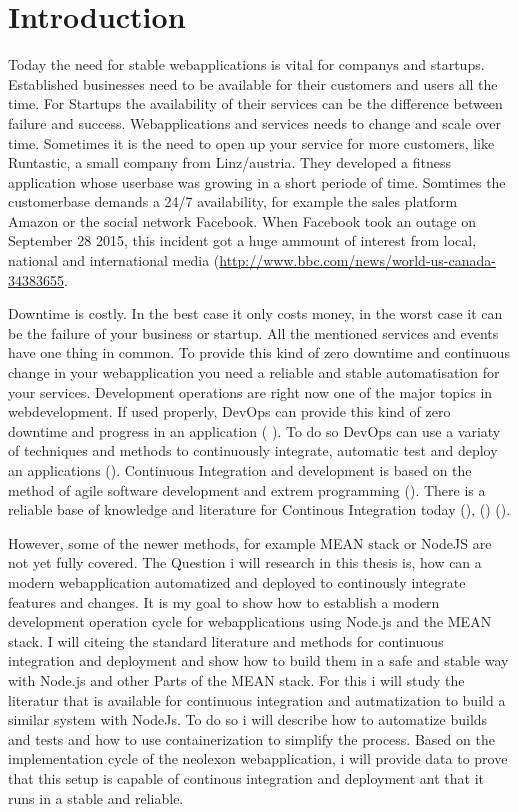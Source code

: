 \section{Introduction}
Today the need for stable webapplications is vital for companys and startups. Established businesses need to be
available for their customers and users all the time. For Startups the availability of their services can be the difference
between failure and success. Webapplications and services needs to change and scale over time. Sometimes it is the need
to open up your service for more customers, like Runtastic, a small company from Linz/austria. They developed
a fitness application whose userbase was growing in a short periode of time. Somtimes the customerbase demands a 24/7
availability, for example the sales platform Amazon or the social network Facebook. When Facebook took an outage on September 28 2015,
this incident got a huge ammount of interest from local, national and international media (\url{http://www.bbc.com/news/world-us-canada-34383655}.

Downtime is costly. In the best case it only costs money, in the worst case
it can be the failure of your business or startup. All the mentioned services and events have one thing in common. To provide this kind of zero
downtime and continuous change in your webapplication you need a reliable and stable automatisation for your services. Development operations are
right now one of the major topics in webdevelopment. If used properly, DevOps can provide this kind of zero downtime and progress in an application
(\cite{humble2010continuous} \cite{duvall2007continuous}). To do so DevOps can use a variaty of techniques and methods to continuously
integrate, automatic test and deploy an applications (\cite{meyer2014continuous}).
Continuous Integration and development is based on the method of agile software development and extrem programming
(\cite{lindstrom2004extreme}). There is a reliable base of knowledge and literature for Continous Integration today
(\cite{schaefer2013continuous}), (\cite{fowler2006continuous}) (\cite{fowler2012continuous}).

However, some of the newer methods, for example MEAN stack or NodeJS are not yet fully covered.
The Question i will research in this thesis is, how can a modern webapplication automatized and deployed to continously integrate features and
changes. It is my goal to show how to establish a modern development operation cycle for webapplications using Node.js and the MEAN stack.
I will citeing the standard literature and methods for continuous integration and deployment and show how to build them in a safe and stable
way with Node.js and other Parts of the MEAN stack.
For this i will study the literatur that is available for continuous integration and autmatization to build a similar system with NodeJs.
To do so i will describe how to automatize builds and tests and how to use containerization to simplify the process. Based on the
implementation cycle of the neolexon webapplication, i will provide data to prove that this setup is capable of continous integration and deployment
ant that it runs in a stable and reliable.


